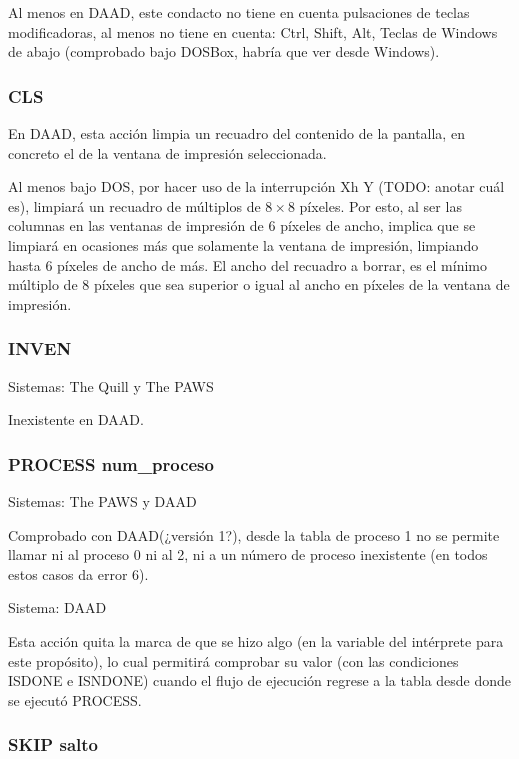 \documentclass[11pt, a5paper]{article}
\newcommand{\quill}{\textsf{The Quill}\xspace}
\newcommand{\paw}{\textsf{The PAWS}\xspace}
\newcommand{\daad}{\textsf{DAAD}\xspace}
\newcommand{\sistema}[1]{\noindent Sistema: #1 \nopagebreak}
\newcommand{\sistemas}[1]{\noindent Sistemas: #1 \nopagebreak}
\begin{document}
Al menos en \daad, este condacto no tiene en cuenta pulsaciones de teclas modificadoras, al menos no tiene en cuenta: Ctrl, Shift, Alt, Teclas de Windows de abajo (comprobado bajo DOSBox, habría que ver desde Windows).

\subsubsection{CLS}

En \daad, esta acción limpia un recuadro del contenido de la pantalla, en concreto el de la ventana de impresión seleccionada.

Al menos bajo DOS, por hacer uso de la interrupción Xh Y (TODO: anotar cuál es), limpiará un recuadro de múltiplos de $8 \times 8$ píxeles. Por esto, al ser las columnas en las ventanas de impresión de 6 píxeles de ancho, implica que se limpiará en ocasiones más que solamente la ventana de impresión, limpiando hasta 6 píxeles de ancho de más. El ancho del recuadro a borrar, es el mínimo múltiplo de 8 píxeles que sea superior o igual al ancho en píxeles de la ventana de impresión.

\subsubsection{INVEN}

\sistemas{\quill y \paw}

Inexistente en \daad.

\subsubsection{PROCESS num\_proceso}

\sistemas{\paw y \daad}

Comprobado con \daad (¿versión 1?), desde la tabla de proceso 1 no se permite llamar ni al proceso 0 ni al 2, ni a un número de proceso inexistente (en todos estos casos da error 6).

\sistema{\daad}

Esta acción quita la marca de que se hizo algo (en la variable del intérprete para este propósito), lo cual permitirá comprobar su valor (con las condiciones ISDONE e ISNDONE) cuando el flujo de ejecución regrese a la tabla desde donde se ejecutó PROCESS.

\subsubsection{SKIP salto}
\end{document}
